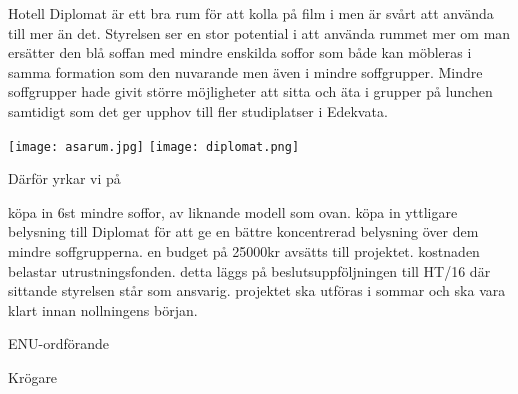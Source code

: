 \documentclass[../_main/handlingar.tex]{subfiles}
\begin{document}

Hotell Diplomat är ett bra rum för att kolla på film i men är svårt att använda till mer än det. Styrelsen ser en stor potential i att använda rummet mer om man ersätter den blå soffan med mindre enskilda soffor som både kan möbleras i samma formation som den nuvarande men även i mindre soffgrupper. Mindre soffgrupper hade givit större möjligheter att sitta och äta i grupper på lunchen samtidigt som det ger upphov till fler studiplatser i Edekvata.

\begin{center}
\texttt{[image: asarum.jpg]}
\texttt{[image: diplomat.png]}
\end{center}

Därför yrkar vi på
\begin{attsatser}
    \att köpa in 6st mindre soffor, av liknande modell som ovan.
    \att köpa in yttligare belysning till Diplomat för att ge en bättre koncentrerad belysning över dem mindre soffgrupperna.
    \att en budget på 25000kr avsätts till projektet.
    \att kostnaden belastar utrustningsfonden.
    \att detta läggs på beslutsuppföljningen till HT/16 där sittande styrelsen står som ansvarig.
    \att projektet ska utföras i sommar och ska vara klart innan nollningens början.
\end{attsatser}

\begin{signatures}{2}
    \ist
    \signature{Johannes Koch}{ENU-ordförande}
    \signature{Malin Lindström}{Krögare}
\end{signatures}
\end{document}
